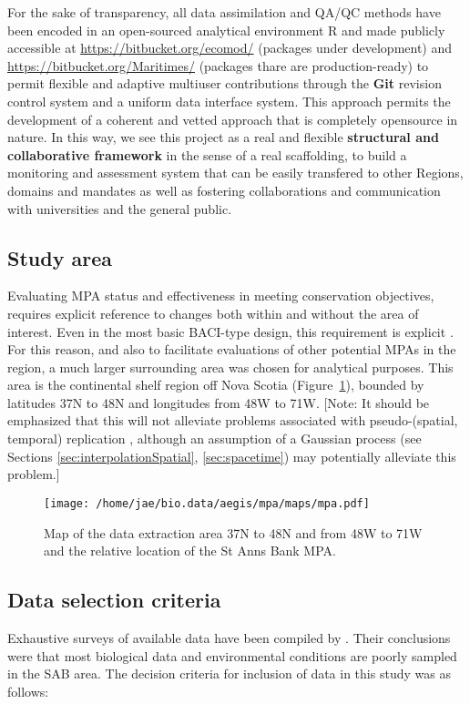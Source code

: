 \documentclass[letterpaper,portrait,11pt]{scrartcl}
\numberwithin{equation}{section}    %
\numberwithin{figure}{section}    %
\numberwithin{table}{section}       %
\begin{document}
For the sake of transparency, all data assimilation and QA/QC methods have been encoded in an open-sourced analytical environment R \parencite{rCran} and made publicly accessible at \url{https://bitbucket.org/ecomod/} (packages under development) and \url{https://bitbucket.org/Maritimes/} (packages thare are production-ready) to permit flexible and adaptive multiuser contributions through the \textbf{Git} revision control system and a uniform data interface system. This approach permits the development of a coherent and vetted approach that is completely opensource in nature. In this way, we see this project as a real and flexible \textbf{structural and collaborative framework} in the sense of a real scaffolding, to build a monitoring and assessment system that can be easily transfered to other Regions, domains and mandates as well as fostering collaborations and communication with universities and the general public. 

\subsection{Study area}
Evaluating MPA status and effectiveness in meeting conservation objectives, requires explicit reference to changes both within and without the area of interest. Even in the most basic BACI-type design, this requirement is explicit \parencite{green:1979, underwood1992}. For this reason, and also to facilitate evaluations of other potential MPAs in the region, a much larger surrounding area was chosen for analytical purposes. This area is the continental shelf region off Nova Scotia (Figure~\ref{fig:SAB}), bounded by latitudes 37N to 48N and longitudes from 48W to 71W. [Note: It should be emphasized that this will not alleviate problems associated with pseudo-(spatial, temporal) replication \parencite{hurlbert1984pseudoreplication}, although an assumption of a Gaussian process (see Sections \ref{sec:interpolationSpatial}, \ref{sec:spacetime}) may potentially alleviate this problem.]

\begin{figure}[h]
  \centering
  \texttt{[image: /home/jae/bio.data/aegis/mpa/maps/mpa.pdf]}
  \caption{Map of the data extraction area 37N to 48N and from 48W to 71W and the relative location of the St Anns Bank MPA.}
  \label{fig:SAB}
\end{figure}


\subsection{Data selection criteria}
Exhaustive surveys of available data have been compiled by \textcite{Ford:2013:sab}. Their conclusions were that most biological data and environmental conditions are poorly sampled in the SAB area. The decision criteria for inclusion of data in this study was as follows:
\end{document}
